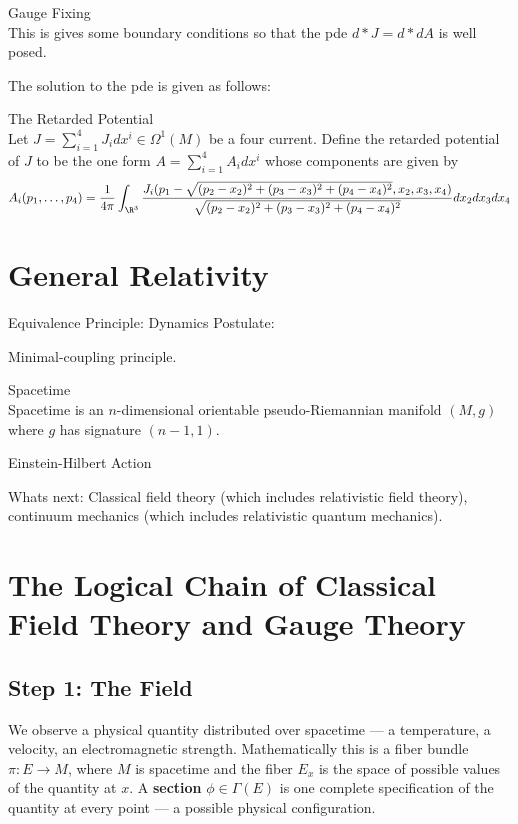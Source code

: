 \documentclass[a4paper]{article}
\begin{document}
\begin{defn}{Gauge Fixing}{}\\
This is gives some boundary conditions so that the pde $d\ast J=d\ast dA$ is well posed. 
\end{defn}

The solution to the pde is given as follows: 

\begin{defn}{The Retarded Potential}{}\\
Let $J=\sum_{i=1}^4J_idx^i\in\Omega^1(M)$ be a four current. Define the retarded potential of $J$ to be the one form $A=\sum_{i=1}^4A_idx^i$ whose components are given by $$A_i(p_1,\dots,p_4)=\frac{1}{4\pi}\int_{\R^3}\frac{J_i(p_1-\sqrt{(p_2-x_2)^2+(p_3-x_3)^2+(p_4-x_4)^2},x_2,x_3,x_4)}{\sqrt{(p_2-x_2)^2+(p_3-x_3)^2+(p_4-x_4)^2}}dx_2dx_3dx_4$$
\end{defn}

\pagebreak
\section{General Relativity}
Equivalence Principle:
Dynamics Postulate: 

Minimal-coupling principle. 

\begin{defn}{Spacetime}{}\\
Spacetime is an $n$-dimensional orientable pseudo-Riemannian manifold $(M,g)$ where $g$ has signature $(n-1,1)$. 
\end{defn}

\begin{defn}{Einstein-Hilbert Action}{}
\end{defn}

Whats next: Classical field theory (which includes relativistic field theory), continuum mechanics (which includes relativistic quantum mechanics). 

\pagebreak
\section{The Logical Chain of Classical Field Theory and Gauge Theory}

\subsection*{Step 1: The Field}

We observe a physical quantity distributed over spacetime — a temperature, a velocity, an electromagnetic strength. Mathematically this is a fiber bundle $\pi: E \to M$, where $M$ is spacetime and the fiber $E_x$ is the space of possible values of the quantity at $x$. A \textbf{section} $\phi \in \Gamma(E)$ is one complete specification of the quantity at every point — a possible physical configuration.
\end{document}

